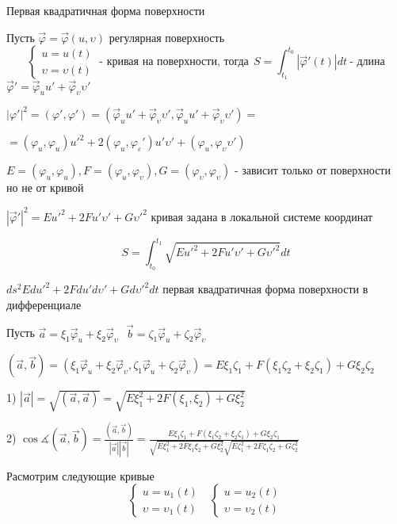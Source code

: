 \begin{title}[\Large]
  Первая квадратичная форма поверхности
\end{title}

Пусть $\vec \varphi = \vec \varphi(u, \upsilon)$ регулярная поверхность
$$
\left\{
  \begin{array}{l}
    u = u(t) \\
    \upsilon = \upsilon(t)
  \end{array}
\right. ~ \text{- кривая на поверхности, тогда} ~~
S = \int_{t_1}^{t_0} |\vec \varphi'(t)| dt ~ \text{- длина}
$$
$\vec \varphi' = \vec \varphi_u u' + \vec \varphi_{\upsilon} \upsilon'$

$
|\varphi'|^2 = (\varphi', \varphi') =
(\vec \varphi_u u' + \vec \varphi_{\upsilon} \upsilon',
\vec \varphi_u u' + \vec \varphi_{\upsilon} \upsilon') =
$

$
= (\varphi_u, \varphi_u)u'^2 + 2(\varphi_u, \varphi_{\varepsilon}')
u' \upsilon' + (\varphi_u, \varphi_{\upsilon} \upsilon')
$

$E = (\varphi_u, \varphi_u), F = (\varphi_u, \varphi_{\upsilon}),
G = (\varphi_{\upsilon}, \varphi_{\upsilon})$ - зависит только от поверхности
но не от кривой

$|\vec \varphi'|^2 = E u'^2 + 2Fu'\upsilon' + G\upsilon'^2$ кривая задана в
локальной системе координат

$$
S = \int_{t_0}^{t_1} \sqrt{E u'^2 + 2Fu'\upsilon' + G\upsilon'^2}dt
$$

$ds^2 Edu'^2 + 2Fdu'd\upsilon' + Gd\upsilon'^2dt$ первая квадратичная форма
поверхности в дифференциале

Пусть $\vec a = \xi_1 \vec \varphi_u + \xi_2 \vec \varphi_{\upsilon} ~~~
\vec b = \zeta_1 \vec \varphi_u + \zeta_2 \vec \varphi_{\upsilon}$

$(\vec a, \vec b) = (\xi_1 \vec \varphi_u + \xi_2 \vec \varphi_{\upsilon},
\zeta_1 \vec \varphi_u + \zeta_2 \vec \varphi_{\upsilon}) =
E \xi_1 \zeta_1 + F(\xi_1 \zeta_2 + \xi_2 \zeta_1) + G\xi_2 \zeta_2$

1) $|\vec a| = \sqrt{(\vec a, \vec a)} = \sqrt{E\xi_1^2 + 2F(\xi_1, \xi_2) +
G\xi_2^2}$

2) $\cos \measuredangle (\vec a, \vec b) =
\frac{(\vec a, \vec b)}{|\vec a||\vec b|} =
\frac{E \xi_1 \zeta_1 + F(\xi_1 \zeta_2 + \xi_2 \zeta_1) + G\xi_2 \zeta_1}
{\sqrt{E\xi_1^2 + 2F\xi_1\xi_2 + G\xi_2^2}
\sqrt{E\zeta_1^2 + 2F\zeta_1\zeta_2 + G\zeta_2^2}}$

Расмотрим следующие кривые
$$
\left\{
  \begin{array}{l}
    u = u_1(t) \\
    \upsilon = \upsilon_1(t)
  \end{array}
\right. ~~~
\left\{
  \begin{array}{l}
    u = u_2(t) \\
    \upsilon = \upsilon_2(t)
  \end{array}
\right.
$$

